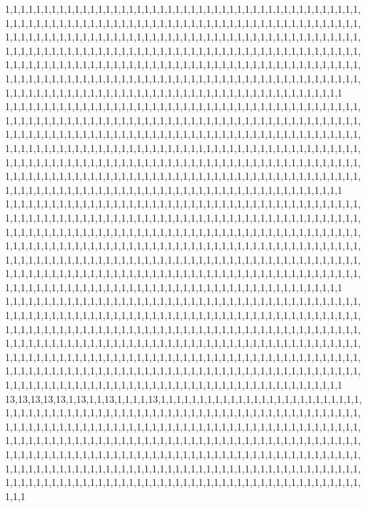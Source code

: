 1,1,1,1,1,1,1,1,1,1,1,1,1,1,1,1,1,1,1,1,1,1,1,1,1,1,1,1,1,1,1,1,1,1,1,1,1,1,1,1,1,1,1,1,1,1,1,1,1,1,1,1,1,1,1,1,1,1,1,1,1,1,1,1,1,1,1,1,1,1,1,1,1,1,1,1,1,1,1,1,1,1,1,1,1,1,1,1,1,1,1,1,1,1,1,1,1,1,1,1,1,1,1,1,1,1,1,1,1,1,1,1,1,1,1,1,1,1,1,1,1,1,1,1,1,1,1,1,1,1,1,1,1,1,1,1,1,1,1,1,1,1,1,1,1,1,1,1,1,1,1,1,1,1,1,1,1,1,1,1,1,1,1,1,1,1,1,1,1,1,1,1,1,1,1,1,1,1,1,1,1,1,1,1,1,1,1,1,1,1,1,1,1,1,1,1,1,1,1,1,1,1,1,1,1,1,1,1,1,1,1,1,1,1,1,1,1,1,1,1,1,1,1,1,1,1,1,1,1,1,1,1,1,1,1,1,1,1,1,1,1,1,1,1,1,1,1,1,1,1,1,1,1,1,1,1,1,1,1,1,1,1,1,1,1,1,1,1,1,1,1,1,1,1,1,1,1,1,1,1,1,1,1,1,1,1,1,1,1,1,1,1,1,1,1,1,1,1,1,1,1,1,1,1,1,1,1,1,1,1,1,1,1,1,1,1,1,1,1,1
1,1,1,1,1,1,1,1,1,1,1,1,1,1,1,1,1,1,1,1,1,1,1,1,1,1,1,1,1,1,1,1,1,1,1,1,1,1,1,1,1,1,1,1,1,1,1,1,1,1,1,1,1,1,1,1,1,1,1,1,1,1,1,1,1,1,1,1,1,1,1,1,1,1,1,1,1,1,1,1,1,1,1,1,1,1,1,1,1,1,1,1,1,1,1,1,1,1,1,1,1,1,1,1,1,1,1,1,1,1,1,1,1,1,1,1,1,1,1,1,1,1,1,1,1,1,1,1,1,1,1,1,1,1,1,1,1,1,1,1,1,1,1,1,1,1,1,1,1,1,1,1,1,1,1,1,1,1,1,1,1,1,1,1,1,1,1,1,1,1,1,1,1,1,1,1,1,1,1,1,1,1,1,1,1,1,1,1,1,1,1,1,1,1,1,1,1,1,1,1,1,1,1,1,1,1,1,1,1,1,1,1,1,1,1,1,1,1,1,1,1,1,1,1,1,1,1,1,1,1,1,1,1,1,1,1,1,1,1,1,1,1,1,1,1,1,1,1,1,1,1,1,1,1,1,1,1,1,1,1,1,1,1,1,1,1,1,1,1,1,1,1,1,1,1,1,1,1,1,1,1,1,1,1,1,1,1,1,1,1,1,1,1,1,1,1,1,1,1,1,1,1,1,1,1,1,1,1,1,1,1,1,1,1,1,1,1,1,1,1
1,1,1,1,1,1,1,1,1,1,1,1,1,1,1,1,1,1,1,1,1,1,1,1,1,1,1,1,1,1,1,1,1,1,1,1,1,1,1,1,1,1,1,1,1,1,1,1,1,1,1,1,1,1,1,1,1,1,1,1,1,1,1,1,1,1,1,1,1,1,1,1,1,1,1,1,1,1,1,1,1,1,1,1,1,1,1,1,1,1,1,1,1,1,1,1,1,1,1,1,1,1,1,1,1,1,1,1,1,1,1,1,1,1,1,1,1,1,1,1,1,1,1,1,1,1,1,1,1,1,1,1,1,1,1,1,1,1,1,1,1,1,1,1,1,1,1,1,1,1,1,1,1,1,1,1,1,1,1,1,1,1,1,1,1,1,1,1,1,1,1,1,1,1,1,1,1,1,1,1,1,1,1,1,1,1,1,1,1,1,1,1,1,1,1,1,1,1,1,1,1,1,1,1,1,1,1,1,1,1,1,1,1,1,1,1,1,1,1,1,1,1,1,1,1,1,1,1,1,1,1,1,1,1,1,1,1,1,1,1,1,1,1,1,1,1,1,1,1,1,1,1,1,1,1,1,1,1,1,1,1,1,1,1,1,1,1,1,1,1,1,1,1,1,1,1,1,1,1,1,1,1,1,1,1,1,1,1,1,1,1,1,1,1,1,1,1,1,1,1,1,1,1,1,1,1,1,1,1,1,1,1,1,1,1,1,1,1,1,1
1,1,1,1,1,1,1,1,1,1,1,1,1,1,1,1,1,1,1,1,1,1,1,1,1,1,1,1,1,1,1,1,1,1,1,1,1,1,1,1,1,1,1,1,1,1,1,1,1,1,1,1,1,1,1,1,1,1,1,1,1,1,1,1,1,1,1,1,1,1,1,1,1,1,1,1,1,1,1,1,1,1,1,1,1,1,1,1,1,1,1,1,1,1,1,1,1,1,1,1,1,1,1,1,1,1,1,1,1,1,1,1,1,1,1,1,1,1,1,1,1,1,1,1,1,1,1,1,1,1,1,1,1,1,1,1,1,1,1,1,1,1,1,1,1,1,1,1,1,1,1,1,1,1,1,1,1,1,1,1,1,1,1,1,1,1,1,1,1,1,1,1,1,1,1,1,1,1,1,1,1,1,1,1,1,1,1,1,1,1,1,1,1,1,1,1,1,1,1,1,1,1,1,1,1,1,1,1,1,1,1,1,1,1,1,1,1,1,1,1,1,1,1,1,1,1,1,1,1,1,1,1,1,1,1,1,1,1,1,1,1,1,1,1,1,1,1,1,1,1,1,1,1,1,1,1,1,1,1,1,1,1,1,1,1,1,1,1,1,1,1,1,1,1,1,1,1,1,1,1,1,1,1,1,1,1,1,1,1,1,1,1,1,1,1,1,1,1,1,1,1,1,1,1,1,1,1,1,1,1,1,1,1,1,1,1,1,1,1,1
13,13,13,13,13,1,13,1,1,13,1,1,1,1,13,1,1,1,1,1,1,1,1,1,1,1,1,1,1,1,1,1,1,1,1,1,1,1,1,1,1,1,1,1,1,1,1,1,1,1,1,1,1,1,1,1,1,1,1,1,1,1,1,1,1,1,1,1,1,1,1,1,1,1,1,1,1,1,1,1,1,1,1,1,1,1,1,1,1,1,1,1,1,1,1,1,1,1,1,1,1,1,1,1,1,1,1,1,1,1,1,1,1,1,1,1,1,1,1,1,1,1,1,1,1,1,1,1,1,1,1,1,1,1,1,1,1,1,1,1,1,1,1,1,1,1,1,1,1,1,1,1,1,1,1,1,1,1,1,1,1,1,1,1,1,1,1,1,1,1,1,1,1,1,1,1,1,1,1,1,1,1,1,1,1,1,1,1,1,1,1,1,1,1,1,1,1,1,1,1,1,1,1,1,1,1,1,1,1,1,1,1,1,1,1,1,1,1,1,1,1,1,1,1,1,1,1,1,1,1,1,1,1,1,1,1,1,1,1,1,1,1,1,1,1,1,1,1,1,1,1,1,1,1,1,1,1,1,1,1,1,1,1,1,1,1,1,1,1,1,1,1,1,1,1,1,1,1,1,1,1,1,1,1,1,1,1,1,1,1,1,1,1,1,1,1,1,1,1,1,1,1,1,1,1,1,1,1,1,1,1,1,1,1,1,1,1,1,1,1
